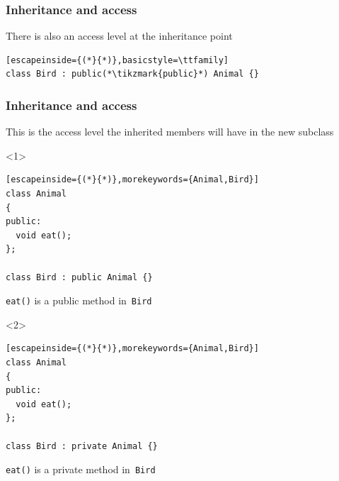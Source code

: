 \documentclass[14pt,a4paper,dvipsnames,usenames]{beamer}
\begin{document}
\begin{frame}[fragile]
  \frametitle{Inheritance and access}

  There is also an access level at the inheritance point

  \vspace{1em}
  \begin{lstlisting}[escapeinside={(*}{*)},basicstyle=\ttfamily]
class Bird : public(*\tikzmark{public}*) Animal {}
  \end{lstlisting}

  \nointerlineskip

\end{frame}

\begin{frame}[fragile]
  \frametitle{Inheritance and access}

  This is the access level the inherited members will have in the new subclass

  \vspace{.5em}
  \begin{onlyenv}<1>
  \begin{lstlisting}[escapeinside={(*}{*)},morekeywords={Animal,Bird}]
class Animal
{
public:
  void eat();
};

class Bird : public Animal {}
  \end{lstlisting}

  \vspace{.5em}
  \lstinline!eat()! is a public method in \,\lstinline[morekeywords={Bird}]!Bird!
  \end{onlyenv}

  \begin{onlyenv}<2>
  \begin{lstlisting}[escapeinside={(*}{*)},morekeywords={Animal,Bird}]
class Animal
{
public:
  void eat();
};

class Bird : private Animal {}
  \end{lstlisting}

  \vspace{.5em}
  \lstinline!eat()! is a private method in \,\lstinline[morekeywords={Bird}]!Bird!
  \end{onlyenv}

\end{frame}
\end{document}
